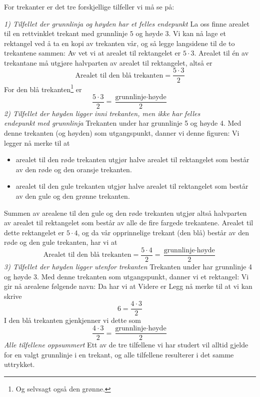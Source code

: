 \subsubsection{\artri \label{artri}}
For trekanter er det tre forskjellige tilfeller vi må se på: \vsk

\textit{1) Tilfellet der grunnlinja og høyden har et felles endepunkt} \os
La oss finne arealet til en rettvinklet trekant med grunnlinje $ 5 $ og høyde $ 3 $.
Vi kan nå lage et rektangel ved å ta en kopi av trekanten vår, og så legge langsidene til de to trekantene sammen:
Av  vet vi at arealet til rektangelet er $ {5\cdot 3} $. Arealet til én av trekantane må utgjøre halvparten av arealet til rektangelet, altså er
\[ \text{Arealet til den blå trekanten} = \frac{5\cdot 3}{2} \]
For den blå trekanten\footnote{Og selvsagt også den grønne.} er 
\[\frac{5\cdot3}{2}= \frac{\text{grunnlinje}\cdot\text{høyde}}{2} \]
\newpage
\textit{2) Tilfellet der høyden ligger inni trekanten, men ikke har felles\\ endepunkt med grunnlinja} \os
Trekanten under har grunnlinje 5 og høyde 4.
Med denne trekanten (og høyden) som utgangspunkt, danner vi denne figuren:
Vi legger nå merke til at
\begin{itemize}
	\item arealet til den røde trekanten utgjør halve arealet til rektangelet som består av den røde og den oransje trekanten.
	\item arealet til den gule trekanten utgjør halve arealet til rektangelet som består av den gule og den grønne trekanten.
\end{itemize}
Summen av arealene til den gule og den røde trekanten utgjør altså halvparten av arealet til rektangelet som består av alle de fire fargede trekantene. Arealet til dette rektangelet er $ 5\cdot4 $, og da vår opprinnelige trekant (den blå) består av den røde og den gule trekanten, har vi at
\[ \text{Arealet til den blå trekanten}=\frac{5\cdot4}{2}=\frac{\text{grunnlinje}\cdot\text{høyde}}{2} \] 
\newpage
\textit{3) Tilfellet der høyden ligger utenfor trekanten} \os
Trekanten under har grunnlinje 4 og høyde 3. 
Med denne trekanten som utgangspunkt, danner vi et rektangel:
Vi gir nå arealene følgende navn:
Da har vi at
Videre er
Legg nå merke til at vi kan skrive
\[ 6=\frac{4\cdot3}{2} \]
I den blå trekanten gjenkjenner vi dette som 
\[ \frac{4\cdot3}{2}=\frac{\text{grunnlinje}\cdot\text{høyde}}{2} \]
\newpage
\textit{Alle tilfellene oppsummert}\os
Ett av de tre tilfellene vi har studert vil alltid  gjelde for en valgt grunnlinje i en trekant, og alle tilfellene resulterer i det samme uttrykket.\regv

